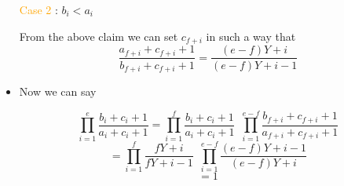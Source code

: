 \begin{itemize}
    \textcolor{orange}{Case 2} : $b_i < a_i$ 
    
From the above claim we can set $c_{f+i}$ in such a way that  \[ \frac{a_{f+i}+c_{f+i}+1}{b_{f+i}+c_{f+i}+1} = \frac{(e-f)Y+i}{(e-f)Y+i-1} \]

\item   Now we can say 

\[\prod_{i=1}^{e} \frac{b_i+c_i+1}{a_i+c_i+1} = \prod_{i=1}^{f}\frac{b_i+c_i+1}{a_i+c_i+1}  \enspace  \prod_{i=1}^{e-f} \frac{b_{f+i}+c_{f+i}+1}{a_{f+i}+c_{f+i}+1} \] \[ = \prod_{i=1}^{f} \frac{fY+i}{fY+i-1} \enspace \prod_{i=1}^{e-f} \frac{(e-f)Y+i-1}{(e-f)Y+i} \]\[=1\] 

\end{itemize}
